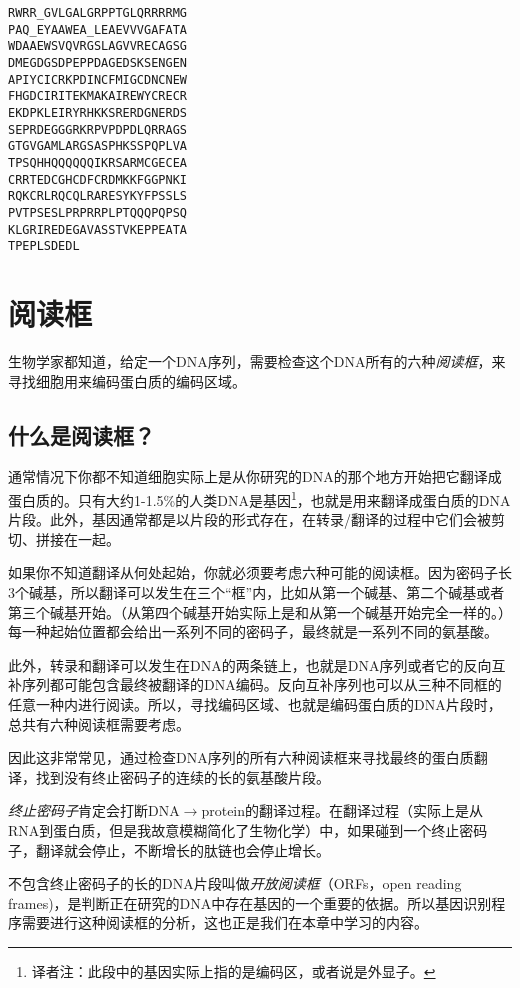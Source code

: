 \begin{lstlisting}
RWRR_GVLGALGRPPTGLQRRRRMG
PAQ_EYAAWEA_LEAEVVVGAFATA
WDAAEWSVQVRGSLAGVVRECAGSG
DMEGDGSDPEPPDAGEDSKSENGEN
APIYCICRKPDINCFMIGCDNCNEW
FHGDCIRITEKMAKAIREWYCRECR
EKDPKLEIRYRHKKSRERDGNERDS
SEPRDEGGGRKRPVPDPDLQRRAGS
GTGVGAMLARGSASPHKSSPQPLVA
TPSQHHQQQQQQIKRSARMCGECEA
CRRTEDCGHCDFCRDMKKFGGPNKI
RQKCRLRQCQLRARESYKYFPSSLS
PVTPSESLPRPRRPLPTQQQPQPSQ
KLGRIREDEGAVASSTVKEPPEATA
TPEPLSDEDL
\end{lstlisting}

\section{阅读框}
生物学家都知道，给定一个DNA序列，需要检查这个DNA所有的六种\textit{阅读框}，来寻找细胞用来编码蛋白质的编码区域。

\subsection{什么是阅读框？}
通常情况下你都不知道细胞实际上是从你研究的DNA的那个地方开始把它翻译成蛋白质的。只有大约1-1.5\%的人类DNA是基因\footnote{译者注：此段中的基因实际上指的是编码区，或者说是外显子。}，也就是用来翻译成蛋白质的DNA片段。此外，基因通常都是以片段的形式存在，在转录/翻译的过程中它们会被剪切、拼接在一起。

如果你不知道翻译从何处起始，你就必须要考虑六种可能的阅读框。因为密码子长3个碱基，所以翻译可以发生在三个“框”内，比如从第一个碱基、第二个碱基或者第三个碱基开始。（从第四个碱基开始实际上是和从第一个碱基开始完全一样的。）每一种起始位置都会给出一系列不同的密码子，最终就是一系列不同的氨基酸。

此外，转录和翻译可以发生在DNA的两条链上，也就是DNA序列或者它的反向互补序列都可能包含最终被翻译的DNA编码。反向互补序列也可以从三种不同框的任意一种内进行阅读。所以，寻找编码区域、也就是编码蛋白质的DNA片段时，总共有六种阅读框需要考虑。

因此这非常常见，通过检查DNA序列的所有六种阅读框来寻找最终的蛋白质翻译，找到没有终止密码子的连续的长的氨基酸片段。

\textit{终止密码子}肯定会打断DNA$\rightarrow$protein的翻译过程。在翻译过程（实际上是从RNA到蛋白质，但是我故意模糊简化了生物化学）中，如果碰到一个终止密码子，翻译就会停止，不断增长的肽链也会停止增长。

不包含终止密码子的长的DNA片段叫做\textit{开放阅读框}（ORFs，open reading
frames)，是判断正在研究的DNA中存在基因的一个重要的依据。所以基因识别程序需要进行这种阅读框的分析，这也正是我们在本章中学习的内容。

